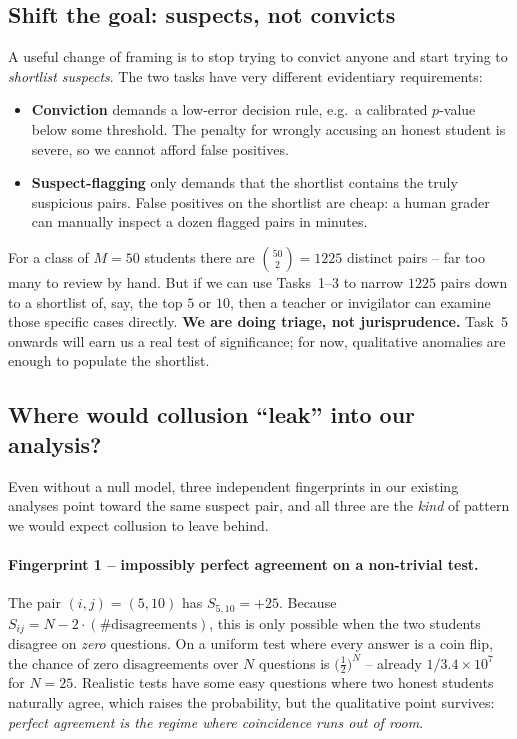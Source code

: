 \documentclass[11pt,a4paper]{article}
\begin{document}
\subsection{Shift the goal: suspects, not convicts}
A useful change of framing is to stop trying to convict anyone and
start trying to \emph{shortlist suspects}. The two tasks have very
different evidentiary requirements:
\begin{itemize}[leftmargin=2em,nosep]
  \item \textbf{Conviction} demands a low-error decision rule, e.g.\
        a calibrated $p$-value below some threshold. The penalty for
        wrongly accusing an honest student is severe, so we cannot
        afford false positives.
  \item \textbf{Suspect-flagging} only demands that the shortlist
        contains the truly suspicious pairs. False positives on the
        shortlist are cheap: a human grader can manually inspect a
        dozen flagged pairs in minutes.
\end{itemize}
For a class of $M = 50$ students there are $\binom{50}{2} = 1225$
distinct pairs -- far too many to review by hand. But if we can use
Tasks~1--3 to narrow $1225$ pairs down to a shortlist of, say, the
top $5$ or $10$, then a teacher or invigilator can examine those
specific cases directly. \textbf{We are doing triage, not jurisprudence.}
Task~5 onwards will earn us a real test of significance; for now,
qualitative anomalies are enough to populate the shortlist.

\subsection{Where would collusion ``leak'' into our analysis?}
Even without a null model, three independent fingerprints in our
existing analyses point toward the same suspect pair, and all three
are the \emph{kind} of pattern we would expect collusion to leave
behind.

\paragraph{Fingerprint 1 -- impossibly perfect agreement on a non-trivial
test.} The pair $(i,j) = (5,10)$ has $S_{5,10} = +25$. Because
$S_{ij} = N - 2\cdot(\#\text{disagreements})$, this is only possible
when the two students disagree on \emph{zero} questions. On a uniform
test where every answer is a coin flip, the chance of zero
disagreements over $N$ questions is $\bigl(\tfrac12\bigr)^N$ -- already
$1/3.4\times 10^7$ for $N=25$. Realistic tests have some easy
questions where two honest students naturally agree, which raises the
probability, but the qualitative point survives: \emph{perfect
agreement is the regime where coincidence runs out of room}.
\end{document}
